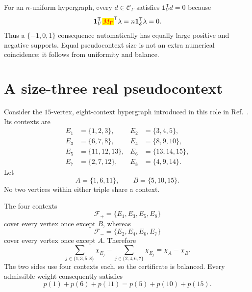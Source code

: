 \documentclass[
  twocolumn,
  aps,
  pra,
  floatfix,
  amsmath,amssymb,
  longbibliography
]{revtex4-2}
\theoremstyle{definition}
\theoremstyle{remark}
\newcommand{\E}{\mathcal E}
\newcommand{\one}{\mathbf 1}
\newcommand{\corrmath}[1]{\begingroup\setlength{\fboxsep}{1pt}\colorbox{yellow}{\ensuremath{\color{red}#1}}\endgroup}
\begin{document}
For an $n$-uniform hypergraph, every $d\in\mathcal C_\Gamma$ satisfies
$\one_V^{\mathsf T}d=0$ because
\[
 \one_V^{\mathsf T}\corrmath{M_\Gamma}^{\mathsf T}\lambda
 =n\one_\E^{\mathsf T}\lambda=0.
\]
Thus a $\{-1,0,1\}$ consequence automatically has equally large positive
and negative supports.  Equal pseudocontext size is not an extra numerical
coincidence; it follows from uniformity and balance.

\section{A size-three real pseudocontext}
\label{sec:mayet}

Consider the $15$-vertex, eight-context hypergraph introduced in this role in
Ref.~\cite{2023-navara-svozil}.  Its contexts are
\begin{align}
 E_1&=\{1,2,3\},& E_2&=\{3,4,5\},\nonumber\\
 E_3&=\{6,7,8\},& E_4&=\{8,9,10\},\nonumber\\
 E_5&=\{11,12,13\},& E_6&=\{13,14,15\},\label{eq:mayet-edges}\\
 E_7&=\{2,7,12\},& E_8&=\{4,9,14\}.\nonumber
\end{align}
Let
\begin{equation}
 A=\{1,6,11\},\qquad B=\{5,10,15\}.
 \label{eq:mayet-targets}
\end{equation}
No two vertices within either triple share a context.

The four contexts
\begin{equation}
 \mathcal F_+=\{E_1,E_3,E_5,E_8\}
 \label{eq:cover-plus}
\end{equation}
cover every vertex once except $B$, whereas
\begin{equation}
 \mathcal F_-=\{E_2,E_4,E_6,E_7\}
 \label{eq:cover-minus}
\end{equation}
cover every vertex once except $A$.  Therefore
\begin{equation}
 \sum_{j\in\{1,3,5,8\}}\chi_{E_j}
 -\sum_{j\in\{2,4,6,7\}}\chi_{E_j}
 =\chi_A-\chi_B.
 \label{eq:mayet-certificate}
\end{equation}
The two sides use four contexts each, so the certificate is balanced.  Every
admissible weight consequently satisfies
\begin{equation}
 p(1)+p(6)+p(11)=p(5)+p(10)+p(15).
 \label{eq:mayet-equality}
\end{equation}
\end{document}

